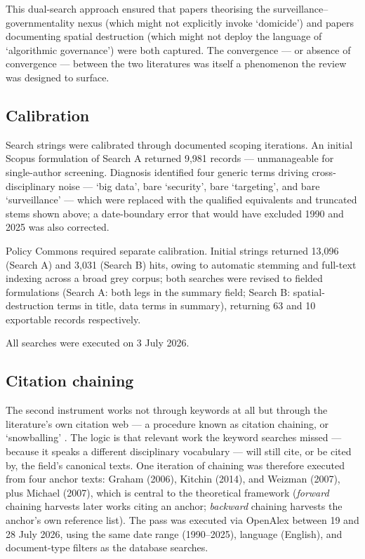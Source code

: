 This dual-search approach ensured that papers theorising the surveillance–governmentality nexus (which might not explicitly invoke `domicide') and papers documenting spatial destruction (which might not deploy the language of `algorithmic governance') were both captured. The convergence — or absence of convergence — between the two literatures was itself a phenomenon the review was designed to surface.

\subsection{Calibration}

Search strings were calibrated through documented scoping iterations. An initial Scopus formulation of Search A returned 9,981 records — unmanageable for single-author screening. Diagnosis identified four generic terms driving cross-disciplinary noise — `big data', bare `security', bare `targeting', and bare `surveillance' — which were replaced with the qualified equivalents and truncated stems shown above; a date-boundary error that would have excluded 1990 and 2025 was also corrected.

Policy Commons required separate calibration. Initial strings returned 13,096 (Search A) and 3,031 (Search B) hits, owing to automatic stemming and full-text indexing across a broad grey corpus; both searches were revised to fielded formulations (Search A: both legs in the summary field; Search B: spatial-destruction terms in title, data terms in summary), returning 63 and 10 exportable records respectively.

All searches were executed on 3 July 2026.

\subsection{Citation chaining}

The second instrument works not through keywords at all but through the literature's own citation web — a procedure known as citation chaining, or `snowballing' \parencite{wohlin2014}. The logic is that relevant work the keyword searches missed — because it speaks a different disciplinary vocabulary — will still cite, or be cited by, the field's canonical texts. One iteration of chaining was therefore executed from four anchor texts: Graham (2006), Kitchin (2014), and Weizman (2007), plus Michael (2007), which is central to the theoretical framework (\emph{forward} chaining harvests later works citing an anchor; \emph{backward} chaining harvests the anchor's own reference list). The pass was executed via OpenAlex \parencite{priem2022openalex} between 19 and 28 July 2026, using the same date range (1990–2025), language (English), and document-type filters as the database searches.


